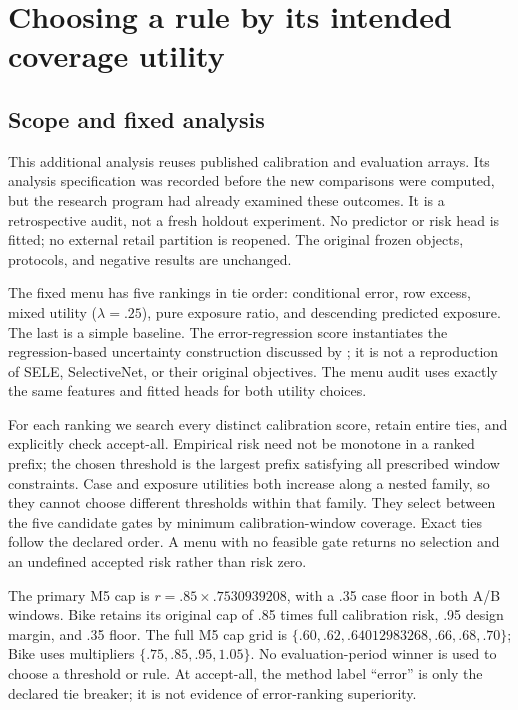 \section{Choosing a rule by its intended coverage utility}
\label{app:policy-choice}

\subsection{Scope and fixed analysis}
This additional analysis reuses published calibration and evaluation arrays. Its analysis specification was recorded before the new comparisons were computed, but the research program had already examined these outcomes. It is a retrospective audit, not a fresh holdout experiment. No predictor or risk head is fitted; no external retail partition is reopened. The original frozen objects, protocols, and negative results are unchanged.

The fixed menu has five rankings in tie order: conditional error, row excess, mixed utility ($\lambda=.25$), pure exposure ratio, and descending predicted exposure. The last is a simple baseline. The error-regression score instantiates the regression-based uncertainty construction discussed by \citet{franc2023reject}; it is not a reproduction of SELE, SelectiveNet, or their original objectives. The menu audit uses exactly the same features and fitted heads for both utility choices.

For each ranking we search every distinct calibration score, retain entire ties, and explicitly check accept-all. Empirical risk need not be monotone in a ranked prefix; the chosen threshold is the largest prefix satisfying all prescribed window constraints. Case and exposure utilities both increase along a nested family, so they cannot choose different thresholds within that family. They select between the five candidate gates by minimum calibration-window coverage. Exact ties follow the declared order. A menu with no feasible gate returns no selection and an undefined accepted risk rather than risk zero.

The primary M5 cap is $r=.85\times.7530939208$, with a .35 case floor in both A/B windows. Bike retains its original cap of .85 times full calibration risk, .95 design margin, and .35 floor. The full M5 cap grid is $\{.60,.62,.64012983268,.66,.68,.70\}$; Bike uses multipliers $\{.75,.85,.95,1.05\}$. No evaluation-period winner is used to choose a threshold or rule. At accept-all, the method label ``error'' is only the declared tie breaker; it is not evidence of error-ranking superiority.

